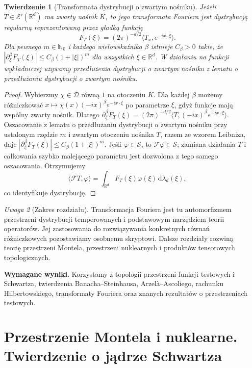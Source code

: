 \documentclass[11pt,a4paper]{article}
\numberwithin{equation}{section}
\theoremstyle{plain}
\newtheorem{twierdzenie}{Twierdzenie}[section]
\theoremstyle{definition}
\theoremstyle{remark}
\newtheorem{uwaga}[twierdzenie]{Uwaga}
\newcommand{\R}{\mathbb R}
\newcommand{\N}{\mathbb N}
\begin{document}
\begin{twierdzenie}[Transformata dystrybucji o zwartym nośniku]
\label{thm:compact-fourier22}
Jeżeli $T\in\mathcal E'(\R^d)$ ma zwarty nośnik $K$,
to jego transformata Fouriera jest dystrybucją regularną
reprezentowaną przez gładką funkcję
\[
F_T(\xi)=(2\pi)^{-d/2}\langle T_x,e^{-ix\cdot\xi}\rangle.
\]
Dla pewnego $m\in\N_0$ i każdego wielowskaźnika $\beta$
istnieje $C_\beta>0$ takie, że
$|\partial_\xi^\beta F_T(\xi)|
\le C_\beta(1+|\xi|)^m$
dla wszystkich $\xi\in\R^d$.
W działaniu na funkcji wykładniczej używamy
przedłużenia dystrybucji o zwartym nośniku
z lematu o przedłużaniu dystrybucji o zwartym nośniku.
\end{twierdzenie}
\begin{proof}
Wybierzmy $\chi\in\mathcal D$ równą $1$ na
otoczeniu $K$. Dla każdej $\beta$ możemy różniczkować
$x\mapsto\chi(x)(-ix)^\beta e^{-ix\cdot\xi}$
po parametrze $\xi$, gdyż funkcje mają wspólny zwarty nośnik.
Dlatego
$\partial_\xi^\beta F_T(\xi)
=(2\pi)^{-d/2}\langle T,(-ix)^\beta e^{-ix\cdot\xi}\rangle$.
Oszacowanie z lematu o przedłużaniu dystrybucji o zwartym nośniku
przy ustalonym rzędzie $m$ i zwartym otoczeniu nośnika
$T$, razem ze wzorem Leibniza, daje
$|\partial_\xi^\beta F_T(\xi)|
\le C_\beta(1+|\xi|)^m$.
Jeśli $\varphi\in\mathcal S$, to
$\mathcal F\varphi\in\mathcal S$; zamiana działania
$T$ i całkowania szybko malejącego parametru jest
dozwolona z tego samego oszacowania. Otrzymujemy
\[
\langle\mathcal FT,\varphi\rangle
=\int_{\R^d}F_T(\xi)\varphi(\xi)
\,\mathrm d\lambda_d(\xi),
\]
co identyfikuje dystrybucję.
\end{proof}

\begin{uwaga}[Zakres rozdziału]
\label{rem:scope22}
Transformacja Fouriera jest tu automorfizmem przestrzeni
dystrybucji temperowanych i podstawowym narzędziem teorii
operatorów. Jej zastosowania do rozwiązywania konkretnych
równań różniczkowych pozostawiamy osobnemu skryptowi.
Dalsze rozdziały rozwiną teorię przestrzeni Montela,
przestrzeni nuklearnych i produktów tensorowych topologicznych.
\end{uwaga}


\setcounter{section}{22}
\noindent\textbf{Wymagane wyniki.} Korzystamy z topologii przestrzeni funkcji testowych i Schwartza, twierdzenia Banacha--Steinhausa, Arzelà--Ascoliego, rachunku Hilbertowskiego, transformaty Fouriera oraz znanych rezultatów o przestrzeniach testowych.
\medskip
\section{Przestrzenie Montela i nuklearne. Twierdzenie o jądrze Schwartza}
\label{sec:montel-nuklearne23}
\end{document}
